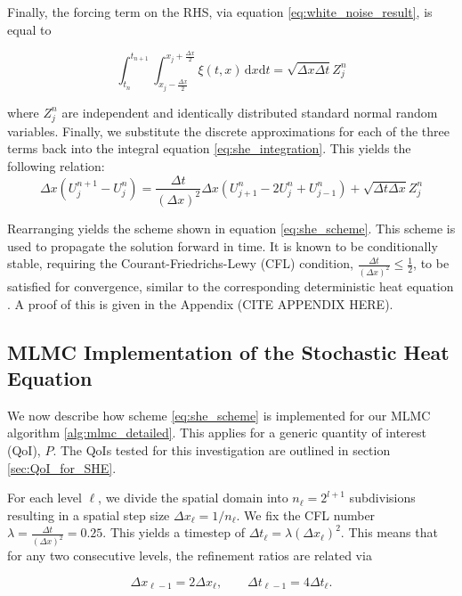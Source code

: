 Finally, the forcing term on the RHS, via equation \eqref{eq:white_noise_result}, is equal to

\begin{equation*}
\int_{t_n}^{t_{n+1}} \int_{x_j-\frac{\Delta x}{2}}^{x_j+\frac{\Delta x}{2}} \xi(t,x) \,\mathrm{d}x\mathrm{d}t = \sqrt{\Delta x \Delta t} Z_j^n
\end{equation*}

where $Z_j^n$ are independent and identically distributed standard normal random variables.
Finally, we substitute the discrete approximations for each of the three terms back into the 
integral equation \eqref{eq:she_integration}. This yields the following relation:
\begin{equation*}
    \Delta x (U_j^{n+1} - U_j^n) = 
    \frac{\Delta t}{(\Delta x)^2} \Delta x (U_{j+1}^n - 2U_j^n + U_{j-1}^n) + 
    \sqrt{\Delta t \Delta x} Z_j^n
\end{equation*}

Rearranging yields the scheme shown in equation \eqref{eq:she_scheme}.
This scheme is used to propagate the solution forward in time. It is known to 
be conditionally stable, requiring the Courant-Friedrichs-Lewy (CFL) condition, 
$\frac{\Delta t}{(\Delta x)^2} \le \frac{1}{2}$, to be satisfied for convergence, 
similar to the corresponding deterministic heat equation \cite{suli2025nspdes}. 
A proof of this is given in the Appendix (CITE APPENDIX HERE).

\subsection{MLMC Implementation of the Stochastic Heat Equation }

We now describe how scheme \eqref{eq:she_scheme} is implemented for our MLMC
algorithm \ref{alg:mlmc_detailed}. This applies for a generic quantity of interest
(QoI), $P$. The QoIs tested for this investigation are outlined in section 
\ref{sec:QoI_for_SHE}.

For each level $\ell$, we divide the spatial domain into $n_{\ell} = 2^{l+1}$ subdivisions
resulting in a spatial step size $\Delta x_\ell = 1 / n_\ell$. We fix the CFL number 
$\lambda = \frac{\Delta t}{(\Delta x)^2} = 0.25$. This yields a timestep of 
$\Delta t_\ell = \lambda (\Delta x_\ell)^2$. This means that for any two 
consecutive levels, the refinement ratios are related via

\begin{equation}\label{eq:she_discrete_relations}
    \Delta x_{\ell - 1} = 2\Delta x_\ell, \qquad \Delta t_{\ell - 1} = 4 \Delta t_\ell.
\end{equation}

